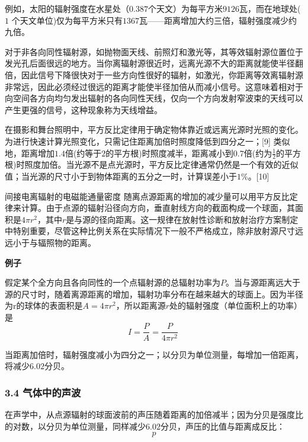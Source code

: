 例如，太阳的辐射强度在水星处（$0.387$个天文）为每平方米$9126$瓦，而在地球处($1$ 个天文单位)仅为每平方米只有$1367$瓦——距离增加大约三倍，辐射强度减少约九倍。

对于非各向同性辐射源，如抛物面天线、前照灯和激光等，其等效辐射源位置位于发光孔后面很远的地方。当你离辐射源很近时，远离光源不大的距离就能使半径翻倍，因此信号下降很快对于一些方向性很好的辐射，如激光，你距离等效离辐射源非常远，因此必须经过很远的距离才能使半径加倍从而减小信号。这意味着相对于向空间各方向均匀发出辐射的各向同性天线，仅向一个方向发射窄波束的天线可以产生更强的信号，这种现象称为天线增益。

在摄影和舞台照明中，平方反比定律用于确定物体靠近或远离光源时光照的变化。为进行快速计算光照变化，只需记住距离加倍时照度降低到四分之一；[9] 类似地，距离增加$1.4$倍(约等于$2$的平方根)时照度减半，距离减小到$0.7$倍(约为$\frac{1}{2}$的平方根)时照度加倍。当光源不是点光源时，平方反比定律通常仍然是一个有效的近似值；当光源的尺寸小于到物体距离的五分之一时，计算误差小于$1 \%$。[10]

间接电离辐射的电磁能通量密度 随离点源距离的增加的减少量可以用平方反比定律来计算。由于点源的辐射沿径向方向，垂直射线方向的截面构成一个球面，其面积是$4\pi r^2$，其中$r$是与源的径向距离。这一规律在放射性诊断和放射治疗方案制定中特别重要，尽管这种比例关系在实际情况下一般不严格成立，除非放射源尺寸远远小于与辐照物的距离。

\textbf{例子}

假定某个全方向且各向同性的一个点辐射源的总辐射功率为$P$。当与源距离远大于源的尺寸时，随着离源距离的增加，辐射功率分布在越来越大的球面上。因为半径为r的球体的表面积是$A=4\pi r^2$，所以距离源$r$处的辐射强度（单位面积上的功率）是
\begin{equation}
I=\frac{P}{A}=\frac{P}{4\pi r^2}~
\end{equation}

当距离加倍时，辐射强度减小为四分之一；以分贝为单位测量，每增加一倍距离，将减少$6.02$分贝。

\subsubsection{3.4 气体中的声波}
在声学中，从点源辐射的球面波前的声压随着距离的加倍减半；因为分贝是强度比的对数，以分贝为单位测量，同样减少$6.02$分贝，声压的比值与距离成反比：
\begin{equation}
p 
\end{equation}